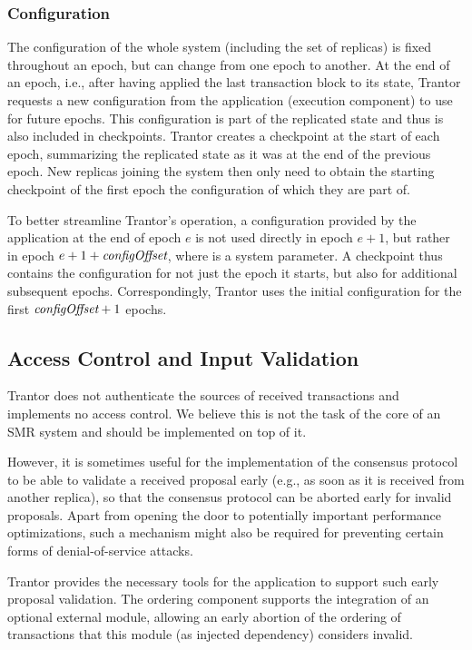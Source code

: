 \documentclass{article}
\begin{document}
\subsubsection{Configuration}
\label{sec:configuration}

The configuration of the whole system (including the set of replicas) is fixed throughout an epoch,
but can change from one epoch to another.
At the end of an epoch, i.e., after having applied the last transaction block to its state,
Trantor requests a new configuration from the application (execution component) to use for future epochs.
This configuration is part of the replicated state and thus is also included in checkpoints.
Trantor creates a checkpoint at the start of each epoch,
summarizing the replicated state as it was at the end of the previous epoch.
New replicas joining the system then only need to obtain the starting checkpoint
of the first epoch the configuration of which they are part of.

To better streamline Trantor’s operation,
a configuration provided by the application at the end of epoch $e$ is not used directly in epoch $e+1$,
but rather in epoch $e+1+\textit{configOffset}$, where  is a system parameter.
A checkpoint thus contains the configuration for not just the epoch it starts,
but also for  additional subsequent epochs.
Correspondingly, Trantor uses the initial configuration for the first $\textit{configOffset}+1$ epochs.

\subsection{Access Control and Input Validation}
\label{sec:access-control-input-validation}

Trantor does not authenticate the sources of received transactions and implements no access control.
We believe this is not the task of the core of an SMR system and should be implemented on top of it.

However, it is sometimes useful for the implementation of the consensus protocol to be able to validate a received proposal early
(e.g., as soon as it is received from another replica), so that the consensus protocol can be aborted early for invalid proposals.
Apart from opening the door to potentially important performance optimizations,
such a mechanism might also be required for preventing certain forms of denial-of-service attacks.

Trantor provides the necessary tools for the application to support such early proposal validation.
The ordering component supports the integration of an optional external  module,
allowing an early abortion of the ordering of transactions that this module (as injected dependency) considers invalid.
\end{document}
